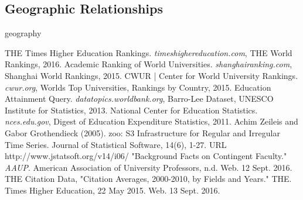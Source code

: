 \documentclass[12pt]{article}
\begin{document}
\subsection{Geographic Relationships}
geography

\begin{thebibliography}{9} 

 THE Times Higher Education Rankings. \textit{timeshighereducation.com}, THE World Rankings, 2016.
 Academic Ranking of World Universities. \textit{shanghairanking.com}, Shanghai World Rankings, 2015.
 CWUR | Center for World University Rankings. \textit{cwur.org}, Worlds Top Universities, Rankings by Country, 2015.
 Education Attainment Query. \textit{datatopics.worldbank.org}, Barro-Lee Dataset, UNESCO Institute for Statistics, 2013.
 National Center for Education Statistics. \textit{nces.edu.gov}, Digest of Education Expenditure Statistics, 2011.
 Achim Zeileis and Gabor Grothendieck (2005). zoo: S3 Infrastructure for Regular and Irregular Time Series. Journal of Statistical Software,
  14(6), 1-27. URL http://www.jstatsoft.org/v14/i06/
 "Background Facts on Contingent Faculty." \textit{AAUP}. American Association of University Professors, n.d. Web. 12 Sept. 2016.
 THE Citation Data, "Citation Averages, 2000-2010, by Fields and Years." THE. Times Higher Education, 22 May 2015. Web. 13 Sept. 2016.
\end{thebibliography} 
\end{document}
